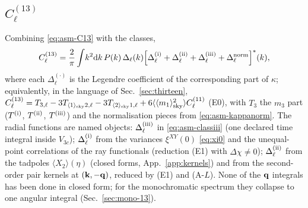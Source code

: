 \subsection{\texorpdfstring{$C_\ell^{(13)}$}{C13}}
\label{sec:asm-C13}
Combining \eqref{eq:asm-C13} with the classes,
\begin{equation}
C^{(13)}_\ell=\frac2\pi\int\!k^2\mathrm d k\,P(k)\,\Delta_\ell(k)\Big[\Delta^{\rm(i)}_\ell+\Delta^{\rm(ii)}_\ell+\Delta^{\rm(iii)}_\ell+\Delta^{\rm norm}_\ell\Big]^*(k),
\label{eq:asm-C13split}
\end{equation}
where each $\Delta^{(\cdot)}_\ell$ is the Legendre coefficient of the corresponding part of $\kappa$; equivalently, in the language of
Sec.~\ref{sec:thirteen},
$C^{(13)}_\ell=T_{3,\ell}-3T_{\langle 1\rangle_{\rm sky}2,\ell}-3T_{\langle 2\rangle_{\rm sky}1,\ell}+6\langle\langle m_1\rangle_{\rm sky}^2\rangle C^{(11)}_\ell$ (E0), with $T_3$ the $m_3$ part
($T^{\rm(i)}$, $T^{\rm(ii)}$, $T^{\rm(iii)}$) and the normalisation pieces from \eqref{eq:asm-kappanorm}.  The radial functions are named
objects: $\Delta^{\rm(iii)}_\ell$ in \eqref{eq:asm-classiii} (one declared time integral inside $V_{3c}$); $\Delta^{\rm(i)}_\ell$ from the
variances $\xi^{XY}(0)$ \eqref{eq:xi0} and the unequal-point correlations of the ray functionals (reduction (E1) with $\Delta\chi\ne0$);
$\Delta^{\rm(ii)}_\ell$ from the tadpoles $\langle X_2\rangle(\eta)$ (closed forms, App.~\ref{app:kernels}) and from the second-order pair kernels
at $(\mathbf k,-\mathbf q)$, reduced by (E1) and (A-$L$).  None of the $\mathbf q$ integrals has been done in closed form; for the monochromatic spectrum they
collapse to one angular integral (Sec.~\ref{sec:mono-13}).

